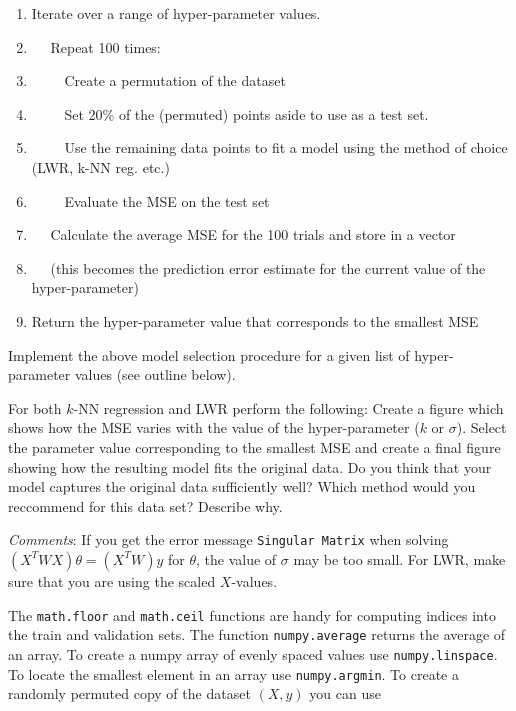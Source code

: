 \documentclass[11pt]{article}
\providecommand{\tightlist}{%
      \setlength{\itemsep}{0pt}\setlength{\parskip}{0pt}}
\begin{document}
\begin{enumerate}
\def\labelenumi{\arabic{enumi}.}
\tightlist
\item
  Iterate over a range of hyper-parameter values.
\item
  \(\quad\) Repeat 100 times:
\item
  \(\qquad\) Create a permutation of the dataset
\item
  \(\qquad\) Set 20\% of the (permuted) points aside to use as a test
  set.
\item
  \(\qquad\) Use the remaining data points to fit a model using the
  method of choice (LWR, k-NN reg. etc.)
\item
  \(\qquad\) Evaluate the MSE on the test set
\item
  \(\quad\) Calculate the average MSE for the 100 trials and store in a
  vector
\item
  \(\quad\) (this becomes the prediction error estimate for the current
  value of the hyper-parameter)
\item
  Return the hyper-parameter value that corresponds to the smallest MSE
\end{enumerate}

Implement the above model selection procedure for a given list of
hyper-parameter values (see outline below).

For both \(k\)-NN regression and LWR perform the following: Create a
figure which shows how the MSE varies with the value of the
hyper-parameter (\(k\) or \(\sigma\)). Select the parameter value
corresponding to the smallest MSE and create a final figure showing how
the resulting model fits the original data. Do you think that your model
captures the original data sufficiently well? Which method would you
reccommend for this data set? Describe why.

\emph{Comments}: If you get the error message \texttt{Singular\ Matrix}
when solving \((X^T W X)\theta = (X^T W)y\) for \(\theta\), the value of
\(\sigma\) may be too small. For LWR, make sure that you are using the
scaled \(X\)-values.

The \texttt{math.floor} and \texttt{math.ceil} functions are handy for
computing indices into the train and validation sets. The function
\texttt{numpy.average} returns the average of an array. To create a
numpy array of evenly spaced values use \texttt{numpy.linspace}. To
locate the smallest element in an array use \texttt{numpy.argmin}. To
create a randomly permuted copy of the dataset \((X,y)\) you can use
\end{document}
